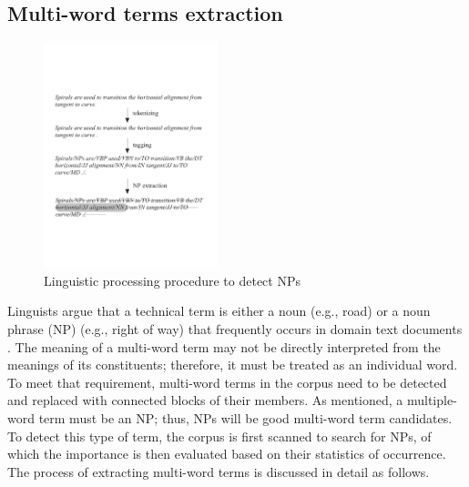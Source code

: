 \documentclass[Journal, BackFigs,NoLists, DoubleSpace]{ascelike}%
\begin{document}
\subsection{Multi-word terms extraction}
%
\begin{figure}[t]
	\centering
	\includegraphics[width=0.45\textwidth]{Figure2_NP_extraction}
	\caption{Linguistic processing procedure to detect NPs}
	\label{fig:np_detect}
\end{figure}
%
Linguists argue that a technical term is either a noun (e.g., road) or a noun phrase (NP) (e.g., right of way) that frequently occurs in domain text documents \cite{justeson95}. The meaning of a multi-word term may not be directly interpreted from the meanings of its constituents; therefore, it must be treated as an individual word.  To meet that requirement, multi-word terms in the corpus need to be detected and replaced with connected blocks of their members. As mentioned, a multiple-word term must be an NP; thus, NPs will be good multi-word term candidates. To detect this type of term, the corpus is first scanned to search for NPs, of which the importance is then evaluated based on their statistics of occurrence. The process of extracting multi-word terms is discussed in detail as follows.  %
\end{document}
